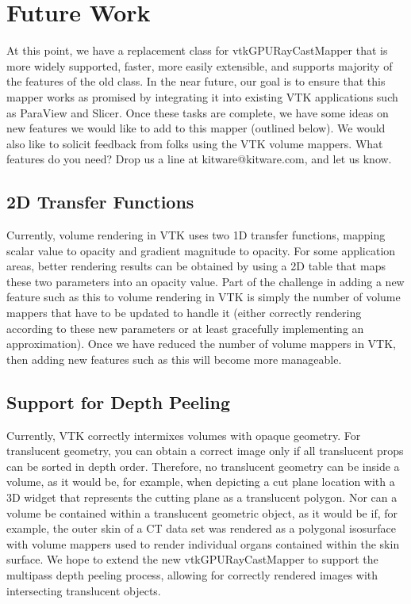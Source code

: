 \section{Future Work}
At this point, we have a replacement class for vtkGPURayCastMapper that is more widely supported, faster, more easily extensible, and supports majority of the features of the old class. In the near future, our goal is to ensure that this mapper works as promised by integrating it into existing VTK applications such as ParaView and Slicer. Once these tasks are complete, we have some ideas on new features we would like to add to this mapper (outlined below). We would also like to solicit feedback from folks using the VTK volume mappers. What features do you need? Drop us a line at kitware@kitware.com, and let us know.

\subsection{2D Transfer Functions} Currently, volume rendering in VTK uses two 1D transfer functions, mapping scalar value to opacity and gradient magnitude to opacity. For some application areas, better rendering results can be obtained by using a 2D table that maps these two parameters into an opacity value. Part of the challenge in adding a new feature such as this to volume rendering in VTK is simply the number of volume mappers that have to be updated to handle it (either correctly rendering according to these new parameters or at least gracefully implementing an approximation). Once we have reduced the number of volume mappers in VTK, then adding new features such as this will become more manageable.

\subsection{Support for Depth Peeling} Currently, VTK correctly intermixes volumes with opaque geometry. For translucent geometry, you can obtain a correct image only if all translucent props can be sorted in depth order. Therefore, no translucent geometry can be inside a volume, as it would be, for example, when depicting a cut plane location with a 3D widget that represents the cutting plane as a translucent polygon.  Nor can a volume be contained within a translucent geometric object, as it would be if, for example, the outer skin of a CT data set was rendered as a polygonal isosurface with volume mappers used to render individual organs contained within the skin surface. We hope to extend the new vtkGPURayCastMapper to support the multipass depth peeling process, allowing for correctly rendered images with intersecting translucent objects.


